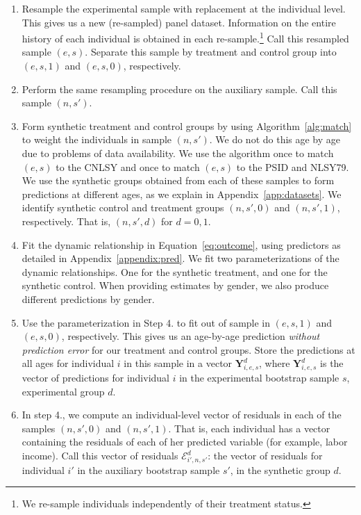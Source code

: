 \begin{enumerate}
\item Resample the experimental sample with replacement at the individual level. This gives us a new (re-sampled) panel dataset. Information on the entire history of each individual is obtained in each re-sample.\footnote{We re-sample individuals independently of their treatment status.} Call this resampled sample $(e,s)$. Separate this sample by treatment and control group into $(e,s,1)$ and $(e,s,0)$, respectively.

\item Perform the same resampling procedure on the auxiliary sample. Call this sample $(n,s')$.

\item Form synthetic treatment and control groups by using Algorithm~\ref{alg:match} to weight the individuals in sample $(n,s')$. We do not do this age by age due to problems of data availability. We use the algorithm once to match $(e,s)$ to the CNLSY and once to match $(e,s)$ to the PSID and NLSY79. We use the synthetic groups obtained from each of these samples to form predictions at different ages, as we explain in Appendix~\ref{app:datasets}. We identify synthetic control and treatment groups $(n,s',0)$ and $(n,s',1)$, respectively. That is, $(n,s',d)$ for $d = {0,1}$.

\item Fit the dynamic relationship in Equation~\eqref{eq:outcome}, using predictors as detailed in Appendix~\ref{appendix:pred}. We fit two parameterizations of the dynamic relationships. One for the synthetic treatment, and one for the synthetic control. When providing estimates by gender, we also produce different predictions by gender.

\item Use the parameterization in Step 4. to fit out of sample in $(e,s,1)$ and $(e,s,0)$, respectively. This gives us an age-by-age prediction \textit{without prediction error} for our treatment and control groups. Store the predictions at all ages for individual $i$ in this sample in a vector $\bm{Y}_{i,e,s}^d$, where $\bm{Y}_{i,e,s}^d$ is the vector of predictions for individual $i$ in the experimental bootstrap sample $s$, experimental group $d$.

\item In step 4., we compute an individual-level vector of residuals in each of the samples $(n,s',0)$ and $(n,s',1)$. That is, each individual has a vector containing the residuals of each of her predicted variable (for example, labor income). Call this vector of residuals $\bm{\mathcal{E}}_{i',n,s'}^d$: the vector of residuals for individual $i'$ in the auxiliary bootstrap sample $s'$, in the synthetic group $d$.


\end{enumerate}
